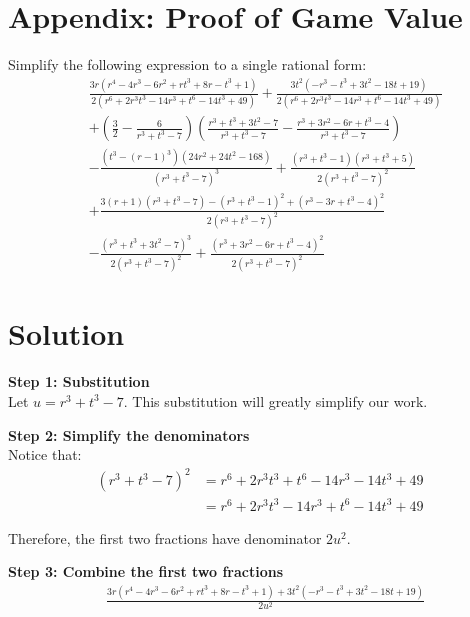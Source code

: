 \documentclass[../../main/main.tex]{subfiles}
\begin{document}
\section{Appendix: Proof of Game Value}
\label{app:game_value}

\begin{customproof}

Simplify the following expression to a single rational form:
\begin{align*}
&\frac{3r(r^4 - 4r^3 - 6r^2 + rt^3 + 8r - t^3 + 1)}{2(r^6 + 2r^3t^3 - 14r^3 + t^6 - 14t^3 + 49)} + \frac{3t^2(-r^3 - t^3 + 3t^2 - 18t + 19)}{2(r^6 + 2r^3t^3 - 14r^3 + t^6 - 14t^3 + 49)} \\
&+ \left(\frac{3}{2} - \frac{6}{r^3 + t^3 - 7}\right)\left(\frac{r^3 + t^3 + 3t^2 - 7}{r^3 + t^3 - 7} - \frac{r^3 + 3r^2 - 6r + t^3 - 4}{r^3 + t^3 - 7}\right) \\
&- \frac{(t^3 - (r-1)^3)(24r^2 + 24t^2 - 168)}{(r^3 + t^3 - 7)^3} + \frac{(r^3 + t^3 - 1)(r^3 + t^3 + 5)}{2(r^3 + t^3 - 7)^2} \\
&+ \frac{3(r+1)(r^3 + t^3 - 7) - (r^3 + t^3 - 1)^2 + (r^3 - 3r + t^3 - 4)^2}{2(r^3 + t^3 - 7)^2} \\
&- \frac{(r^3 + t^3 + 3t^2 - 7)^3}{2(r^3 + t^3 - 7)^2} + \frac{(r^3 + 3r^2 - 6r + t^3 - 4)^2}{2(r^3 + t^3 - 7)^2}
\end{align*}

\section*{Solution}

\textbf{Step 1: Substitution}\\
Let $u = r^3 + t^3 - 7$. This substitution will greatly simplify our work.

\textbf{Step 2: Simplify the denominators}\\
Notice that:
\begin{align}
(r^3 + t^3 - 7)^2 &= r^6 + 2r^3t^3 + t^6 - 14r^3 - 14t^3 + 49\\
&= r^6 + 2r^3t^3 - 14r^3 + t^6 - 14t^3 + 49
\end{align}

Therefore, the first two fractions have denominator $2u^2$.

\textbf{Step 3: Combine the first two fractions}
\begin{align}
&\frac{3r(r^4 - 4r^3 - 6r^2 + rt^3 + 8r - t^3 + 1) + 3t^2(-r^3 - t^3 + 3t^2 - 18t + 19)}{2u^2}
\end{align}


\end{customproof}
\end{document}
